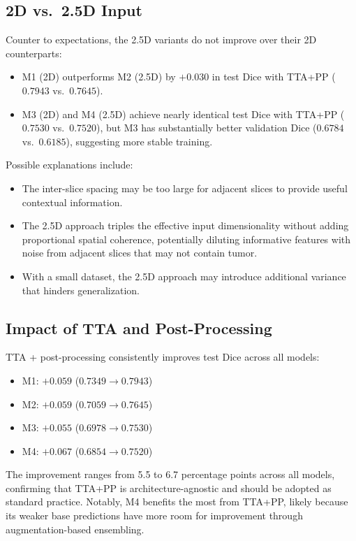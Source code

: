 \documentclass[11pt,a4paper]{article}
\begin{document}
\subsection{2D vs.\ 2.5D Input}

Counter to expectations, the 2.5D variants do not improve over their 2D counterparts:
\begin{itemize}
    \item M1 (2D) outperforms M2 (2.5D) by $+0.030$ in test Dice with TTA+PP ($0.7943$ vs.\ $0.7645$).
    \item M3 (2D) and M4 (2.5D) achieve nearly identical test Dice with TTA+PP ($0.7530$ vs.\ $0.7520$), but M3 has substantially better validation Dice ($0.6784$ vs.\ $0.6185$), suggesting more stable training.
\end{itemize}

Possible explanations include:
\begin{itemize}
    \item The inter-slice spacing may be too large for adjacent slices to provide useful contextual information.
    \item The 2.5D approach triples the effective input dimensionality without adding proportional spatial coherence, potentially diluting informative features with noise from adjacent slices that may not contain tumor.
    \item With a small dataset, the 2.5D approach may introduce additional variance that hinders generalization.
\end{itemize}

\subsection{Impact of TTA and Post-Processing}

TTA + post-processing consistently improves test Dice across all models:
\begin{itemize}
    \item M1: $+0.059$ ($0.7349 \to 0.7943$)
    \item M2: $+0.059$ ($0.7059 \to 0.7645$)
    \item M3: $+0.055$ ($0.6978 \to 0.7530$)
    \item M4: $+0.067$ ($0.6854 \to 0.7520$)
\end{itemize}

The improvement ranges from 5.5 to 6.7 percentage points across all models, confirming that TTA+PP is architecture-agnostic and should be adopted as standard practice. Notably, M4 benefits the most from TTA+PP, likely because its weaker base predictions have more room for improvement through augmentation-based ensembling.
\end{document}
